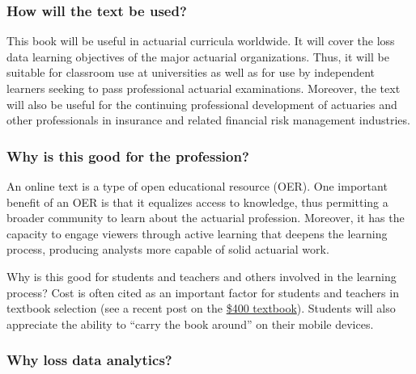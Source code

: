 \documentclass[
]{book}
\begin{document}
\hypertarget{how-will-the-text-be-used}{%
\subsubsection*{How will the text be used?}\label{how-will-the-text-be-used}}

This book will be useful in actuarial curricula worldwide. It will cover the loss data learning objectives of the major actuarial organizations. Thus, it will be suitable for classroom use at universities as well as for use by independent learners seeking to pass professional actuarial examinations. Moreover, the text will also be useful for the continuing professional development of actuaries and other professionals in insurance and related financial risk management industries.

\hypertarget{why-is-this-good-for-the-profession}{%
\subsubsection*{Why is this good for the profession?}\label{why-is-this-good-for-the-profession}}

An online text is a type of open educational resource (OER). One important benefit of an OER is that it equalizes access to knowledge, thus permitting a broader community to learn about the actuarial profession. Moreover, it has the capacity to engage viewers through active learning that deepens the learning process, producing analysts more capable of solid actuarial work.

Why is this good for students and teachers and others involved in the learning process? Cost is often cited as an important factor for students and teachers in textbook selection (see a recent post on the \href{https://www.aei.org/publication/the-new-era-of-the-400-college-textbook-which-is-part-of-the-unsustainable-higher-education-bubble/}{\$400 textbook}). Students will also appreciate the ability to ``carry the book around'' on their mobile devices.

\hypertarget{why-loss-data-analytics}{%
\subsubsection*{Why loss data analytics?}\label{why-loss-data-analytics}}
\end{document}
